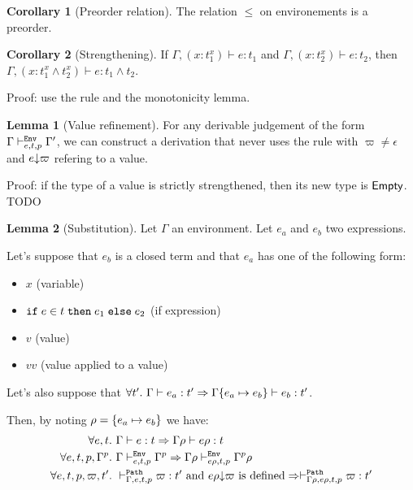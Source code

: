 \documentclass[a4paper]{article}
\theoremstyle{definition}
\newtheorem{lemma}{Lemma}
\newtheorem{corollary}{Corollary}
\begin{document}
        \begin{corollary}[Preorder relation]
          The relation $\leq$ on environements is a preorder.
        \end{corollary}
    
        \begin{corollary}[Strengthening]
          If $\Gamma, (x:t_1^x) \vdash e:t_1$ and $\Gamma, (x:t_2^x) \vdash e:t_2$, then
          $\Gamma, (x:t_1^x \land t_2^x) \vdash e:t_1\land t_2$.
        \end{corollary}
        Proof: use the  rule and the monotonicity lemma.

        \begin{lemma}[Value refinement]
          For any derivable judgement of the form $\Gamma \evdash p e t \Gamma'$, we can construct a derivation that
          never uses the rule  with $\varpi\neq\epsilon$ and $\occ e \varpi$ refering to a value.
        \end{lemma}
        Proof: if the type of a value is strictly strengthened, then its new type is $\Empty$. TODO

        \begin{lemma}[Substitution]
          Let $\Gamma$ an environment. Let $e_a$ and $e_b$ two expressions.

          Let's suppose that $e_b$ is a closed term and that $e_a$ has one of the following form:
          \begin{itemize}
            \item $x$ (variable)
            \item $\ite e t {e_1} {e_2}$ (if expression)
            \item $v$ (value)
            \item $v v$ (value applied to a value)
          \end{itemize}
          Let's also suppose that $\forall t'.\ \Gamma \vdash e_a : t' \Rightarrow \Gamma\subst {e_a} {e_b} \vdash e_b:t'$.
          
          Then, by noting $\rho = \subst {e_a} {e_b}$ we have:
          \begin{align*}
            \forall e,t.\ &\Gamma \vdash e:t \Rightarrow \Gamma\rho \vdash e\rho:t\\
            \forall e,t,p,\Gamma^p.\ &\Gamma \evdash p {e} {t} \Gamma^p \Rightarrow \Gamma\rho \evdash p {e\rho} {t} {\Gamma^p}\rho\\
            \forall e,t,p,\varpi,t'.\ &\pvdash \Gamma p e t \varpi:t' \text{ and }\occ {e\rho} \varpi\text{ is defined} \Rightarrow \pvdash {\Gamma\rho} p {e\rho} t \varpi:t'
          \end{align*}
        \end{lemma}
\end{document}
